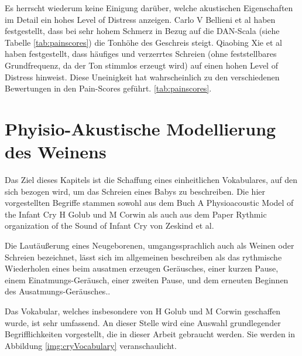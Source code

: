 Es herrscht wiederum keine Einigung darüber, welche akustischen Eigenschaften im Detail ein hohes Level of Distress anzeigen. Carlo V Bellieni et al \cite{dan} haben festgestellt, dass bei sehr hohem Schmerz in Bezug auf die DAN-Scala (siehe Tabelle \ref{tab:painscores}) die Tonhöhe des Geschreis steigt. Qiaobing Xie et al \cite{lod} haben festgestellt, dass häufiges und \glqq verzerrtes\grqq{} Schreien (ohne feststellbares Grundfrequenz, da der Ton stimmlos erzeugt wird)  auf einen hohen Level of Distress hinweist.\cite{signal} Diese Uneinigkeit hat wahrscheinlich zu den verschiedenen Bewertungen in den Pain-Scores geführt. \ref{tab:painscores}.

\section{Phyisio-Akustische Modellierung des Weinens}
\label{sec:acousticModel}

Das Ziel dieses Kapitels ist die Schaffung eines einheitlichen Vokabulares, auf den sich bezogen wird, um das Schreien eines Babys zu beschreiben. Die hier vorgestellten Begriffe stammen sowohl aus dem Buch \glqq A Physioacoustic Model of the Infant Cry \grqq{} H Golub und M Corwin \cite{cryModel} als auch aus dem Paper \glqq Rythmic organization of the Sound of Infant Cry \grqq{} von Zeskind et al.\cite{rythmic}

Die Lautäußerung eines Neugeborenen, umgangssprachlich auch als \glqq Weinen\grqq{} oder \glqq Schreien\grqq{} bezeichnet, lässt sich im allgemeinen beschreiben als das \glqq rythmische Wiederholen eines beim ausatmen erzeugen Geräusches, einer kurzen Pause, einem Einatmungs-Geräusch, einer zweiten Pause, und dem erneuten Beginnen des Ausatmungs-Geräusches.\grqq \cite{wolff}.

Das Vokabular, welches insbesondere von H Golub und M Corwin geschaffen wurde, ist sehr umfassend. An dieser Stelle wird eine Auswahl grundlegender Begrifflichkeiten vorgestellt, die in dieser Arbeit gebraucht werden. Sie werden in Abbildung \ref{img:cryVocabulary} veranschaulicht.

